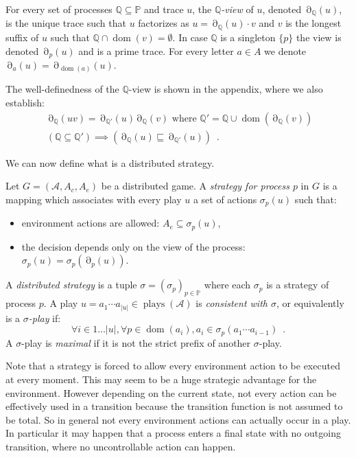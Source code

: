\documentclass[a4paper,UKenglish]{lipics-v2016}
\newcommand{\PP}{\mathbb{P}}
\newcommand{\QQ}{\mathbb{Q}}
\renewcommand{\AA}{\mathcal{A}}
\newcommand{\pref}{\sqsubseteq}
\DeclareMathOperator{\dom}{dom}
\DeclareMathOperator{\view}{\partial}
\DeclareMathOperator{\plays}{plays}
\begin{document}
\begin{definition}[Views]\label{def:views}
For every set of processes $\QQ\subseteq \PP$
and trace $u$,
the \emph{$\QQ$-view} of $u$, denoted $\view_\QQ(u)$,
 is the unique trace such that
 $u$ factorizes as
$
u=\view_\QQ(u)\cdot v$ and
$v$ is the longest suffix of $u$ such that 
$\QQ\cap \dom(v)=\emptyset$.
In case $\QQ$ is a singleton $\{p\}$ the view is denoted
$\view_p(u)$ and is a prime trace.
For every letter $a \in A$ we denote $\view_a(u)=\view_{\dom(a)}(u)$.
\end{definition}

The well-definedness of the $\QQ$-view is shown in the appendix, where we also establish:
\begin{align}
\label{eq:viewdec}
&
\view_\QQ(uv)=\view_{\QQ'}(u)\view_\QQ(v)
\text{ where }
\QQ'=\QQ\cup \dom(\view_\QQ(v))\enspace\\
\label{viewsub}
& (\QQ\subseteq \QQ') \implies 
(\view_\QQ(u)
 \pref
\view_{\QQ'}(u))\enspace.
\end{align}

We can now define what is a distributed strategy.

\begin{definition}
Let $G=(\AA,A_c, A_e)$ be a distributed game.
A \emph{strategy for process $p$} in $G$ is a mapping
which associates with every play $u$ a set of actions $\sigma_p(u)$ such that:
\begin{itemize}
\item
environment actions are allowed: $A_e\subseteq \sigma_p(u)$,
\item
the decision depends only on the view of the process:
$\sigma_p(u)=\sigma_p(\view_p(u))$.
\end{itemize}
A \emph{distributed strategy}
 is a tuple $\sigma=(\sigma_p)_{p\in\PP}$
where each $\sigma_p$ is a strategy of process $p$.
A play $u=a_1\cdots a_{|u|}\in\plays(\AA)$ is \emph{consistent with $\sigma$},
or equivalently is a \emph{$\sigma$-play} if:
\[
\forall i \in 1\ldots |u|,
\forall p\in\dom(a_i),
a_i\in\sigma_p(a_1\cdots a_{i-1})\enspace.
\]
A $\sigma$-play is \emph{maximal} if it is not the strict prefix of another $\sigma$-play.
\end{definition}

Note that a strategy is forced to allow every environment action to be executed at every moment.
This may seem to be a huge strategic advantage for the environment.
However depending on the current state,
not every action can be effectively used in a transition
because the transition function is not assumed to be total.
So in general not every environment actions can actually occur in a play.
In particular it may happen that a process enters a final state
with no outgoing transition, where
no uncontrollable action can happen.
 
\end{document}
